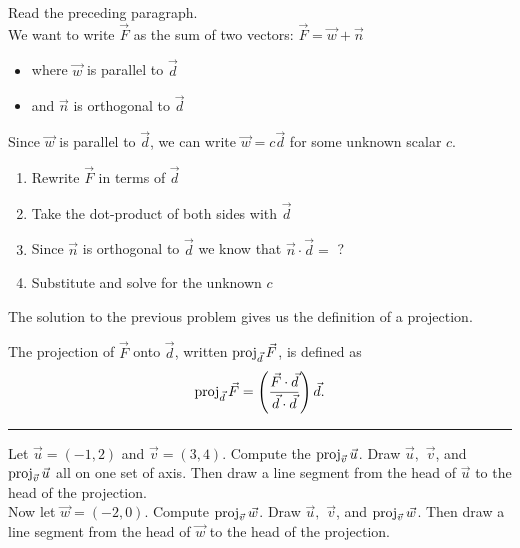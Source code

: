 \begin{problem}\label{prob:force intro}
Read the preceding paragraph.\\
We want to write $\vec F$ as the sum of two vectors: $\vec F = \vec w+\vec n$
\begin{itemize}
	\item where $\vec w$ is parallel to $\vec d$ 
	\item and $\vec n$ is orthogonal to $\vec d$
\end{itemize}
Since $\vec w$ is parallel to $\vec d$, we can write $\vec w=c\vec d$ for some unknown scalar $c$.\\
\begin{enumerate}
	\item Rewrite $\vec F$ in terms of $\vec d$
	\item Take the dot-product of both sides with $\vec d$
	\item Since $\vec n$ is orthogonal to $\vec d$ we know that $\vec n \cdot \vec d =$ ?
	\item Substitute and solve for the unknown $c$
\end{enumerate}
\end{problem}

The solution to the previous problem gives us the definition of a projection.

\begin{definition}
The projection of $\vec F$ onto $\vec d$, written $\operatorname{proj}_{\vec d}\vec F$, is defined as $$\operatorname{proj}_{\vec d}\vec F = \left(\frac{\vec F\cdot \vec d}{\vec d\cdot \vec d}\right)\vec d.$$
\end{definition}

\hrule

\begin{problem} 
%
Let $\vec u=(-1,2)$ and $\vec v=(3,4)$. Compute the $\operatorname{proj}_{\vec v}\vec u$. Draw $\vec u,$ $\vec v$, and $\operatorname{proj}_{\vec v}\vec u$ all on one set of axis. Then draw a line segment from the head of $\vec u$ to the head of the projection.\\

Now let $\vec w=(-2,0)$. Compute $\operatorname{proj}_{\vec v}\vec w$. Draw $\vec u,$ $\vec v$, and $\operatorname{proj}_{\vec v}\vec w$. Then draw a line segment from the head of $\vec w$ to the head of the projection.

\end{problem}

